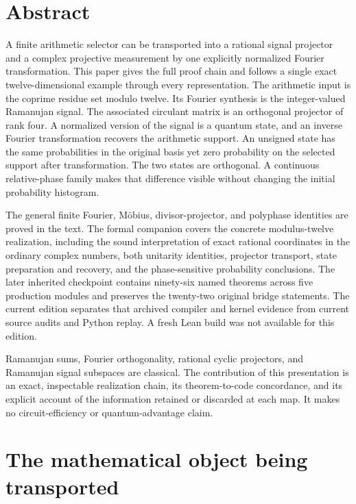 \hypertarget{abstract}{%
\section*{Abstract}\label{abstract}}

A finite arithmetic selector can be transported into a rational signal
projector and a complex projective measurement by one explicitly
normalized Fourier transformation. This paper gives the full proof chain
and follows a single exact twelve-dimensional example through every
representation. The arithmetic input is the coprime residue set modulo
twelve. Its Fourier synthesis is the integer-valued Ramanujan signal.
The associated circulant matrix is an orthogonal projector of rank four.
A normalized version of the signal is a quantum state, and an inverse
Fourier transformation recovers the arithmetic support. An unsigned
state has the same probabilities in the original basis yet zero
probability on the selected support after transformation. The two states
are orthogonal. A continuous relative-phase family makes that difference
visible without changing the initial probability histogram.

The general finite Fourier, Möbius, divisor-projector, and polyphase
identities are proved in the text. The formal companion covers the
concrete modulus-twelve realization, including the sound interpretation
of exact rational coordinates in the ordinary complex numbers, both
unitarity identities, projector transport, state preparation and
recovery, and the phase-sensitive probability conclusions. The later
inherited checkpoint contains ninety-six named theorems across five
production modules and preserves the twenty-two original bridge
statements. The current edition separates that archived compiler and
kernel evidence from current source audits and Python replay. A fresh
Lean build was not available for this edition.

Ramanujan sums, Fourier orthogonality, rational cyclic projectors, and
Ramanujan signal subspaces are classical. The contribution of this
presentation is an exact, inspectable realization chain, its
theorem-to-code concordance, and its explicit account of the information
retained or discarded at each map. It makes no circuit-efficiency or
quantum-advantage claim.

\hypertarget{the-mathematical-object-being-transported}{%
\section{The mathematical object being
transported}\label{the-mathematical-object-being-transported}}

